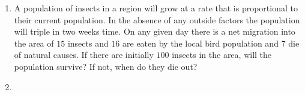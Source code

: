 \documentclass[11pt]{article}
\begin{document}
\begin{enumerate}
\item
A population of insects in a region will grow at a rate that is proportional to their current population. In the absence of any outside factors the population will triple in two weeks time. On any given day there is a net migration into the area of \(15\) insects and \(16\) are eaten by the local bird population and \(7\) die of natural causes. If there are initially \(100\) insects in the area, will the population survive? If not, when do they die out?

\item




































\end{enumerate}
\end{document}
